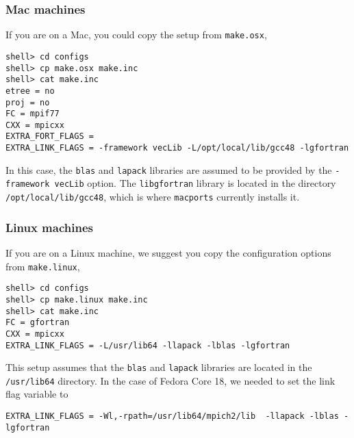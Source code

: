 \documentclass[11pt]{article}
\begin{document}
\subsubsection{Mac machines}
If you are on a Mac, you could copy the setup from \verb+make.osx+,
\begin{verbatim}
shell> cd configs
shell> cp make.osx make.inc
shell> cat make.inc
etree = no
proj = no
FC = mpif77
CXX = mpicxx
EXTRA_FORT_FLAGS =
EXTRA_LINK_FLAGS = -framework vecLib -L/opt/local/lib/gcc48 -lgfortran
\end{verbatim}
In this case, the \verb+blas+ and \verb+lapack+ libraries are assumed to be provided by the
\verb+-framework vecLib+ option. The \verb+libgfortran+ library is located in the directory
\verb+/opt/local/lib/gcc48+, which is where \verb+macports+ currently installs it.

\subsubsection{Linux machines}
If you are on a Linux machine, we suggest you copy the configuration options from \verb+make.linux+,
\begin{verbatim}
shell> cd configs
shell> cp make.linux make.inc
shell> cat make.inc
FC = gfortran
CXX = mpicxx
EXTRA_LINK_FLAGS = -L/usr/lib64 -llapack -lblas -lgfortran
\end{verbatim}
This setup assumes that the \verb+blas+ and \verb+lapack+ libraries are located in the
\verb+/usr/lib64+ directory.
In the case of Fedora Core 18, we needed to set the link flag variable to
\begin{verbatim}
EXTRA_LINK_FLAGS = -Wl,-rpath=/usr/lib64/mpich2/lib  -llapack -lblas -lgfortran
\end{verbatim}
\end{document}
